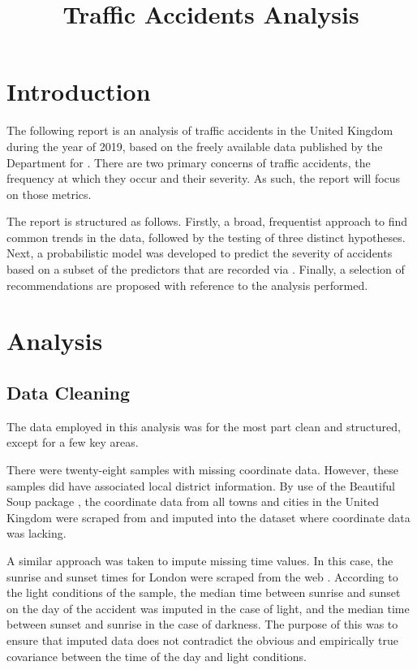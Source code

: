 \documentclass[12pt]{article}
\title{Traffic Accidents Analysis}
\date{}
\begin{document}
\maketitle



\section{Introduction}

The following report is an analysis of traffic accidents in the United Kingdom during the year of 2019, based on the freely available data published by the Department for \parencite{accidents2019, vehicles2019, casualties2019}. There are two primary concerns of traffic accidents, the frequency at which they occur and their severity. As such, the report will focus on those metrics.

The report is structured as follows. Firstly, a broad, frequentist approach to find common trends in the data, followed by the testing of three distinct hypotheses. Next, a probabilistic model was developed to predict the severity of accidents based on a subset of the predictors that are recorded via \textcite{stats2019}. Finally, a selection of recommendations are proposed with reference to the analysis performed.

\section{Analysis}

\subsection{Data Cleaning}

The data employed in this analysis was for the most part clean and structured, except for a few key areas.

There were twenty-eight samples with missing coordinate data. However, these samples did have associated local district information. By use of the Beautiful Soup package \parencite{bs4}, the coordinate data from all towns and cities in the United Kingdom were scraped from \cite{cities} and imputed into the dataset where coordinate data was lacking.

A similar approach was taken to impute missing time values. In this case, the sunrise and sunset times for London were scraped from the web \parencite{sunrise_sunset}. According to the light conditions of the sample, the median time between sunrise and sunset on the day of the accident was imputed in the case of light, and the median time between sunset and sunrise in the case of darkness. The purpose of this was to ensure that imputed data does not contradict the obvious and empirically true covariance between the time of the day and light conditions.
\end{document}
